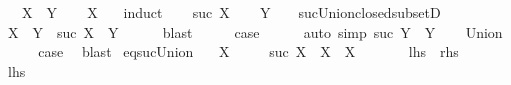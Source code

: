 \begin{isabellebody}
\ \ \ {\isachardoublequoteopen}X\ {\isasymsubseteq}\ Y{\isachardoublequoteclose}\isanewline
%
\isadelimproof
\ \ %
\endisadelimproof
%
\isatagproof
{}\isamarkupfalse%
\ {\isacartoucheopen}X\ {\isasymin}\ {\isasymC}{\isacartoucheclose}\isanewline
{}\isamarkupfalse%
\ induct\isanewline
\ \ \isamarkupfalse%
\ {\isacharparenleft}{\kern0pt}suc\ X{\isacharparenright}{\kern0pt}\isanewline
\ \ \isamarkupfalse%
\ {\isacartoucheopen}Y\ {\isasymin}\ {\isasymC}{\isacartoucheclose}\ \ suc{\isacharunderscore}{\kern0pt}Union{\isacharunderscore}{\kern0pt}closed{\isacharunderscore}{\kern0pt}subsetD\ \isamarkupfalse%
\ {\isachardoublequoteopen}X\ {\isacharequal}{\kern0pt}\ Y\ {\isasymor}\ suc\ X\ {\isasymsubseteq}\ Y{\isachardoublequoteclose}\isanewline
\ \ \ \ \isamarkupfalse%
\ blast\isanewline
\ \ \isamarkupfalse%
\ \isamarkupfalse%
\ {\isacharquery}{\kern0pt}case\isanewline
\ \ \ \ \isamarkupfalse%
\ {\isacharparenleft}{\kern0pt}auto\ simp{\isacharcolon}{\kern0pt}\ {\isacartoucheopen}suc\ Y\ {\isacharequal}{\kern0pt}\ Y{\isacartoucheclose}{\isacharparenright}{\kern0pt}\isanewline
{}\isamarkupfalse%
\isanewline
\ \ \isamarkupfalse%
\ Union\isanewline
\ \ \isamarkupfalse%
\ \isamarkupfalse%
\ {\isacharquery}{\kern0pt}case\ \isamarkupfalse%
\ blast\isanewline
{}\isamarkupfalse%
%
\endisatagproof
{\isafoldproof}%
%
\isadelimproof
\isanewline
%
\endisadelimproof
\isanewline
{}\isamarkupfalse%
\ eq{\isacharunderscore}{\kern0pt}suc{\isacharunderscore}{\kern0pt}Union{\isacharcolon}{\kern0pt}\isanewline
\ \ \ {\isachardoublequoteopen}X\ {\isasymin}\ {\isasymC}{\isachardoublequoteclose}\isanewline
\ \ \ {\isachardoublequoteopen}suc\ X\ {\isacharequal}{\kern0pt}\ X\ {\isasymlongleftrightarrow}\ X\ {\isacharequal}{\kern0pt}\ {\isasymUnion}{\isasymC}{\isachardoublequoteclose}\isanewline
\ \ \ \ {\isacharparenleft}{\kern0pt}\ {\isachardoublequoteopen}{\isacharquery}{\kern0pt}lhs\ {\isasymlongleftrightarrow}\ {\isacharquery}{\kern0pt}rhs{\isachardoublequoteclose}{\isacharparenright}{\kern0pt}\isanewline
%
\isadelimproof
%
\endisadelimproof
%
\isatagproof
{}\isamarkupfalse%
\isanewline
\ \ \isamarkupfalse%
\ {\isacharquery}{\kern0pt}lhs\isanewline
\ \ \isamarkupfalse%
\ \isamarkupfalse%

\end{isabellebody}
